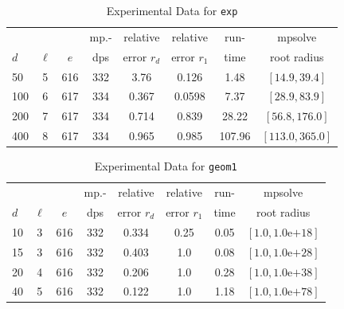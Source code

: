 \documentclass[runningheads]{llncs}
\begin{document}
\begin{table}
\caption{Experimental Data for \texttt{exp}} %
\label{tab:exp}
\vskip -0.15in
\begin{center}
\begin{small}
\begin{sc}
\begin{tabular}{lccccccc}
\toprule
&  &  & mp.-& relative  & relative & run- & mpsolve \\
$d$& $\ell$& $e$ & dps&error $r_d$       & error $r_1$ &time& root radius\\
\midrule
 50 & 5 & 616 & 332 & 3.76 & 0.126 & 1.48 & $[14.9, 39.4]$\\
100 & 6 & 617 & 334 & 0.367 & 0.0598 & 7.37 & $[28.9, 83.9]$\\
 200 & 7 & 617 & 334 & 0.714 & 0.839 & 28.22 & $[56.8, 176.0]$\\
 400 & 8 & 617 & 334 & 0.965 & 0.985 & 107.96 & $[113.0, 365.0]$\\
\bottomrule
\end{tabular}
\end{sc}
\end{small}
\end{center}
\vskip 0.05in
\end{table}

\begin{table}
\caption{Experimental Data for \texttt{geom1}} %
\label{tab:geom1}
\vskip -0.15in
\begin{center}
\begin{small}
\begin{sc}
\begin{tabular}{lccccccc}
\toprule
&  &  & mp.-& relative  & relative & run- & mpsolve \\
$d$& $\ell$& $e$ & dps&error $r_d$       & error $r_1$ &time& root radius\\
\midrule
 10 & 3 & 616 & 332 & 0.334 & 0.25 & 0.05 & $[1.0, 1.0\text{e+}18]$\\
 15 & 3 & 616 & 332 & 0.403 & 1.0 & 0.08 & $[1.0, 1.0\text{e+}28]$\\
 20 & 4 & 616 & 332 & 0.206 & 1.0 & 0.28 & $[1.0, 1.0\text{e+}38]$\\
 40 & 5 & 616 & 332 & 0.122 & 1.0 & 1.18 & $[1.0, 1.0\text{e+}78]$\\
\bottomrule
\end{tabular}
\end{sc}
\end{small}
\end{center}
\vskip 0.05in
\end{table}
\end{document}
